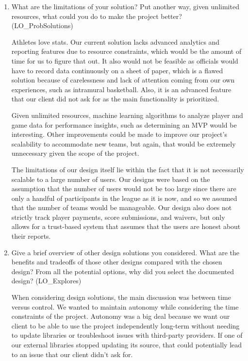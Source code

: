 \documentclass[12pt, titlepage]{article}
\begin{document}
\begin{enumerate}
  \item What are the limitations of your solution?  Put another way, given
        unlimited resources, what could you do to make the project better? (LO\_ProbSolutions)

        Athletes love stats. Our current solution lacks advanced analytics and reporting features due to resource constraints, which would be the amount of time for us to figure that out. It also would not be feasible as officials would have to record data continuously on a sheet of paper, which is a flawed solution because of carelessness and lack of attention coming from our own experiences, such as intramural basketball. Also, it is an advanced feature that our client did not ask for as the main functionality is prioritized.

        Given unlimited resources, machine learning algorithms to analyze player and game data for performance insights, such as determining an MVP would be interesting. Other improvements could be made to improve our project’s scalability to accommodate new teams, but again, that would be extremely unnecessary given the scope of the project.

        The limitations of our design itself lie within the fact that it is not necessarily scalable to a large number of users.
        Our designs were based on the assumption that the number of users would not be too large since there are only a handful of participants in the league as it is now,
        and so we assumed that the number of teams would be manageable. Our design also does not strictly track
        player payments, score submissions, and waivers, but only allows for a trust-based system that assumes
        that the users are honest about their reports.

  \item Give a brief overview of other design solutions you considered.  What
        are the benefits and tradeoffs of those other designs compared with the chosen
        design?  From all the potential options, why did you select the documented design?
        (LO\_Explores)

        When considering design solutions, the main discussion was between time versus control. We wanted to maintain autonomy while considering the time constraints of the project. Autonomy was a big deal because we want our client to be able to use the project independently long-term without needing to update libraries or troubleshoot issues with third-party providers. If one of our external libraries stopped updating its source, that could potentially lead to an issue that our client didn’t ask for.


\end{enumerate}
\end{document}
